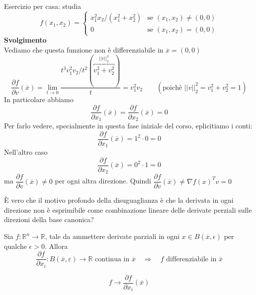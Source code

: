 \begin{exercise}
\label{richiamibigi:exercise01}
Esercizio per casa: studia
$$
   f(x_1, x_2)= \begin{cases}x_1^2 x_2 / (x_1^2 + x_2^2)  
    & \mbox{se } (x_1, x_2) \neq (0,0)  \\
   0 & \mbox{se } (x_1,x_2) = (0,0)\end{cases}
$$
\textbf{Svolgimento} \\
Vediamo che questa funzione non \`e differenziabile in
$\overline{x} = (0,0)$
$$
\dfrac{\partial f}{\partial v} (\overline{x})
=
\lim_{t \to 0}
\dfrac{t^{3}v_1^{2}v_2 / t^{2}(\overbracket{v_1^{2} + v_2^{2}}^{||v||_2^{2}})}{t}
=
v_1^{2}v_2
 \qquad ( \text{poich\`e } ||v||_{2}^{2} = v_1^{2} + v_2^{2} = 1)
$$
In particolare abbiamo
$$\dfrac{\partial f}{\partial x_1} (\overline{x})
=
\dfrac{\partial f}{\partial x_2} (\overline{x})
=
0
$$
Per farlo vedere, specialmente in questa fase iniziale del corso,
eplicitiamo i conti:
$$\dfrac{\partial f}{\partial x_1} (\overline{x}) =
1^{2}\cdot 0  = 0
$$ 
Nell'altro caso
$$\dfrac{\partial f}{\partial x_2} (\overline{x}) =
0^{2}\cdot 1  = 0
$$ 
ma $\dfrac{\partial f}{\partial v} (\overline{x}) \neq 0$
per ogni altra direzione. Quindi
$
\dfrac{\partial f}{\partial v} (\overline{x})
\neq
\nabla f(x)^{T}v = 0
$ \\
\begin{openquestion}
\`E vero che il motivo profondo della disuguaglianza \`e che la derivata
in ogni direzione non \`e esprimibile come combinazione
lineare delle derivate perziali sulle direzioni della base canonica?
\end{openquestion}
\end{exercise}

\begin{theo}
\label{richiamibigi:differenzialetotale}
Sia $f:\mathbb{R}^n \to \mathbb{R}$, tale da ammettere derivate
parziali in ogni $x \in B(\overline{x},\epsilon)$ per qualche
$\epsilon > 0$. Allora
$$
\frac{\partial f}{\partial x_i}: B(\overline{x}, \varepsilon)
 \to \mathbb{R}  \text{  continua in  } \overline{x}
\quad  \Longrightarrow \quad f  \text{  differenziabile in  }
 \overline{x}
$$

$$f \to \frac{\partial f}{\partial x_i}(\overline{x})$$
\end{theo}

